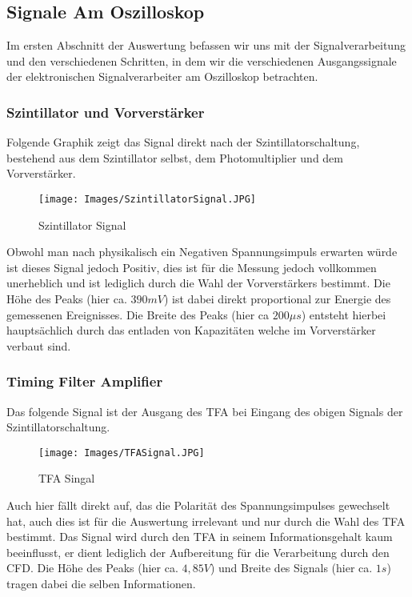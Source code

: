 \documentclass{article}
\begin{document}
        \subsection{Signale Am Oszilloskop}
            Im ersten Abschnitt der Auswertung befassen wir uns mit der Signalverarbeitung und den verschiedenen
            Schritten, in dem wir die verschiedenen Ausgangssignale der elektronischen Signalverarbeiter am Oszilloskop betrachten.


            \subsubsection{Szintillator und Vorverstärker}
                Folgende Graphik zeigt das Signal direkt nach der Szintillatorschaltung, bestehend aus
                dem Szintillator selbst, dem Photomultiplier und dem Vorverstärker. 
                \begin{figure}[H]
                    \centering
                    \texttt{[image: Images/SzintillatorSignal.JPG]}
                    \caption{Szintillator Signal}
                \end{figure}
                Obwohl man nach physikalisch ein Negativen Spannungsimpuls erwarten würde ist dieses Signal jedoch Positiv, dies ist für die
                Messung jedoch vollkommen unerheblich und ist lediglich durch die Wahl der Vorverstärkers bestimmt. 
                Die Höhe des Peaks (hier ca. $390mV$) ist dabei direkt proportional zur Energie des gemessenen
                Ereignisses. Die Breite des Peaks (hier ca $200\mu s$) entsteht hierbei hauptsächlich durch das entladen von Kapazitäten
                welche im Vorverstärker verbaut sind.
                
            \subsubsection{Timing Filter Amplifier}
                Das folgende Signal ist der Ausgang des TFA bei Eingang des obigen Signals der Szintillatorschaltung.
                \begin{figure}[H]
                    \centering
                    \texttt{[image: Images/TFASignal.JPG]}
                    \caption{TFA Singal}
                \end{figure}
                Auch hier fällt direkt auf, das die Polarität des Spannungsimpulses gewechselt hat, auch dies ist für die Auswertung irrelevant und
                nur durch die Wahl des TFA bestimmt. \newline
                Das Signal wird durch den TFA in seinem Informationsgehalt kaum beeinflusst, er dient lediglich der Aufbereitung für
                die Verarbeitung durch den CFD. Die Höhe des Peaks (hier ca. $4,85V$) und Breite des Signals (hier ca. $1s$) tragen dabei die selben
                Informationen.
\end{document}
